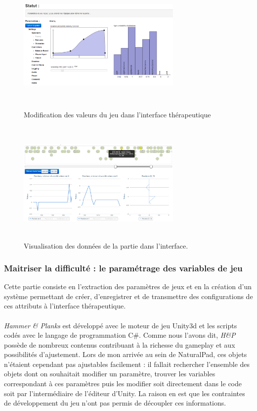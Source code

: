 \begin{figure}[h!]
   \begin{minipage}[b]{0.49\linewidth}
		\centering 
		\includegraphics[width=8cm, height=6cm]{images/interface_parametres.png}
		\caption{Modification des valeurs du jeu dans l'interface thérapeutique}
		\label{interface_therapeutique_01}
   \end{minipage}\hfill
   \begin{minipage}[b]{0.49\linewidth}   
		\centering
		\includegraphics[width=8cm, height=6cm]{images/interface_recap.png}
		\caption{Visualisation des données de la partie dans l'interface.}
		\label{interface_therapeutique_02}
   \end{minipage}
\end{figure}
	\subsubsection*{Maitriser la difficulté : le paramétrage des variables de jeu}
Cette partie consiste en l'extraction des paramètres de jeux et en la création d'un système permettant de créer, d'enregistrer et de transmettre des configurations de ces attributs à l'interface thérapeutique.

\paragraph{}
\emph{Hammer \& Planks} est développé avec le moteur de jeu Unity3d et les scripts codés avec le langage de programmation C\#. Comme nous l'avons dit, \emph{H\&P} possède de nombreux contenus contribuant à la richesse du gameplay et aux possibilités d'ajustement. Lors de mon arrivée au sein de NaturalPad, ces objets n'étaient cependant pas ajustables facilement : il fallait rechercher l'ensemble des objets dont on souhaitait modifier un paramètre, trouver les variables correspondant à ces paramètres puis les modifier soit directement dans le code soit par l'intermédiaire de l'éditeur d'Unity. La raison en est que les contraintes de développement du jeu n'ont pas permis de découpler ces informations.

